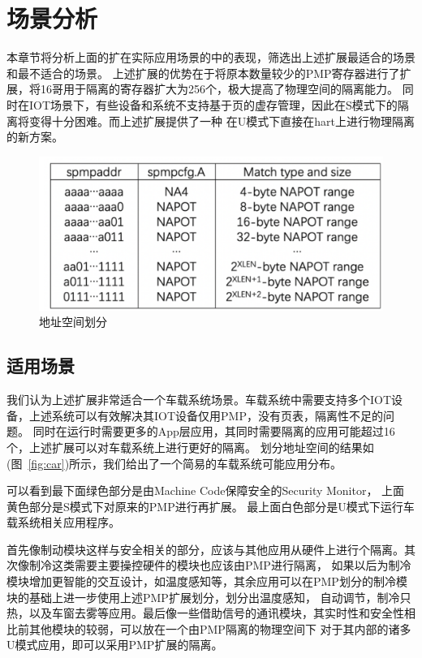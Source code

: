 \section{场景分析}
本章节将分析上面的扩在实际应用场景的中的表现，筛选出上述扩展最适合的场景和最不适合的场景。
上述扩展的优势在于将原本数量较少的PMP寄存器进行了扩展，将16哥用于隔离的寄存器扩大为256个，极大提高了物理空间的隔离能力。
同时在IOT场景下，有些设备和系统不支持基于页的虚存管理，因此在S模式下的隔离将变得十分困难。而上述扩展提供了一种
在U模式下直接在hart上进行物理隔离的新方案。

\begin{figure}
    \centering
    \includegraphics[scale=0.35]{Figures/extend/address.png}
    \decoRule
    \caption{地址空间划分}
    \label{fig:address}
\end{figure}

\subsection{适用场景}
我们认为上述扩展非常适合一个车载系统场景。车载系统中需要支持多个IOT设备，上述系统可以有效解决其IOT设备仅用PMP，没有页表，隔离性不足的问题。
同时在运行时需要更多的App层应用，其同时需要隔离的应用可能超过16个，上述扩展可以对车载系统上进行更好的隔离。
划分地址空间的结果如(图~\ref{fig:car})所示，我们给出了一个简易的车载系统可能应用分布。


可以看到最下面绿色部分是由Machine Code保障安全的Security Monitor， 
上面黄色部分是S模式下对原来的PMP进行再扩展。
最上面白色部分是U模式下运行车载系统相关应用程序。

首先像制动模块这样与安全相关的部分，应该与其他应用从硬件上进行个隔离。其次像制冷这类需要主要操控硬件的模块也应该由PMP进行隔离，
如果以后为制冷模块增加更智能的交互设计，如温度感知等，其余应用可以在PMP划分的制冷模块的基础上进一步使用上述PMP扩展划分，划分出温度感知，
自动调节，制冷只热，以及车窗去雾等应用。最后像一些借助信号的通讯模块，其实时性和安全性相比前其他模块的较弱，可以放在一个由PMP隔离的物理空间下
对于其内部的诸多U模式应用，即可以采用PMP扩展的隔离。

